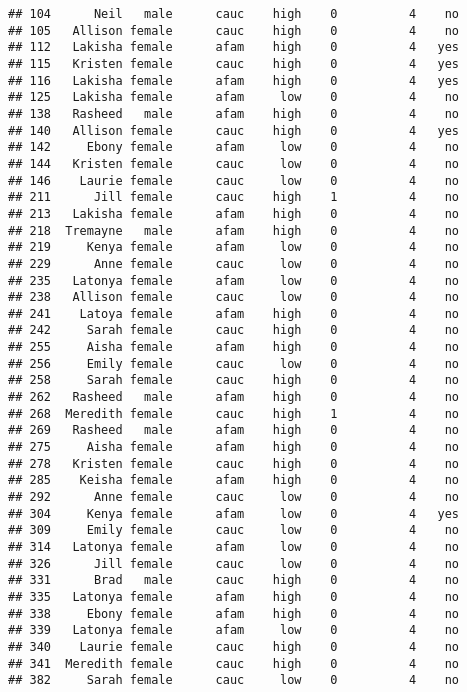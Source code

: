 \documentclass[
]{article}
\begin{document}
\begin{verbatim}
## 104      Neil   male      cauc    high    0          4    no
## 105   Allison female      cauc    high    0          4    no
## 112   Lakisha female      afam    high    0          4   yes
## 115   Kristen female      cauc    high    0          4   yes
## 116   Lakisha female      afam    high    0          4   yes
## 125   Lakisha female      afam     low    0          4    no
## 138   Rasheed   male      afam    high    0          4    no
## 140   Allison female      cauc    high    0          4   yes
## 142     Ebony female      afam     low    0          4    no
## 144   Kristen female      cauc     low    0          4    no
## 146    Laurie female      cauc     low    0          4    no
## 211      Jill female      cauc    high    1          4    no
## 213   Lakisha female      afam    high    0          4    no
## 218  Tremayne   male      afam    high    0          4    no
## 219     Kenya female      afam     low    0          4    no
## 229      Anne female      cauc     low    0          4    no
## 235   Latonya female      afam     low    0          4    no
## 238   Allison female      cauc     low    0          4    no
## 241    Latoya female      afam    high    0          4    no
## 242     Sarah female      cauc    high    0          4    no
## 255     Aisha female      afam    high    0          4    no
## 256     Emily female      cauc     low    0          4    no
## 258     Sarah female      cauc    high    0          4    no
## 262   Rasheed   male      afam    high    0          4    no
## 268  Meredith female      cauc    high    1          4    no
## 269   Rasheed   male      afam    high    0          4    no
## 275     Aisha female      afam    high    0          4    no
## 278   Kristen female      cauc    high    0          4    no
## 285    Keisha female      afam    high    0          4    no
## 292      Anne female      cauc     low    0          4    no
## 304     Kenya female      afam     low    0          4   yes
## 309     Emily female      cauc     low    0          4    no
## 314   Latonya female      afam     low    0          4    no
## 326      Jill female      cauc     low    0          4    no
## 331      Brad   male      cauc    high    0          4    no
## 335   Latonya female      afam    high    0          4    no
## 338     Ebony female      afam    high    0          4    no
## 339   Latonya female      afam     low    0          4    no
## 340    Laurie female      cauc    high    0          4    no
## 341  Meredith female      cauc    high    0          4    no
## 382     Sarah female      cauc     low    0          4    no

\end{verbatim}
\end{document}
